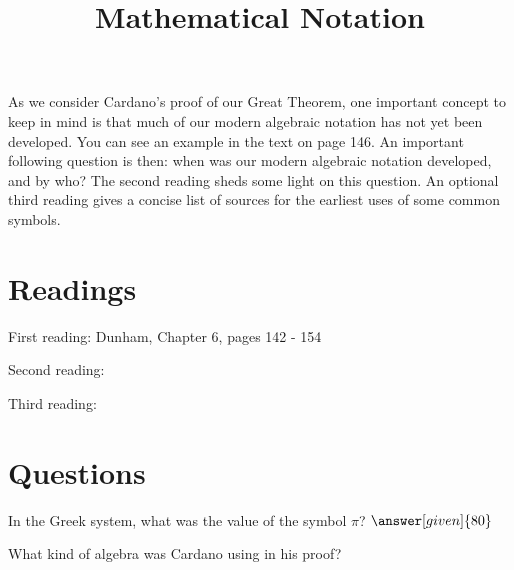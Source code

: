 \documentclass[nooutcomes]{ximera}
\title{Mathematical Notation}
\begin{document}
\begin{abstract}
    
\end{abstract}
\maketitle

As we consider Cardano's proof of our Great Theorem, one important concept to keep in mind is that much of our modern algebraic notation has not yet been developed.  You can see an example in the text on page 146.  An important following question is then: when was our modern algebraic notation developed, and by who?  The second reading sheds some light on this question.  An optional third reading gives a concise list of sources for the earliest uses of some common symbols.


\section{Readings}
First reading: Dunham, Chapter 6, pages 142 - 154

Second reading: 

Third reading: 

\section{Questions}

\begin{question}
In the Greek system, what was the value of the symbol $\pi$? $\answer[given]{80}$
\end{question}

\begin{question}
What kind of algebra was Cardano using in his proof?
\begin{multipleChoice}
\end{multipleChoice}
\end{question}

%
%
\end{document}
